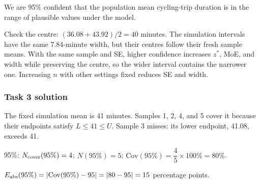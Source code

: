 \par\smallskip
{}
We are 95\% confident that the population mean cycling-trip duration is in the range of plausible values under the model.

Check the centre: $(36.08+43.92)/2=40$ minutes. The simulation intervals have the same 7.84-minute width, but their centres follow their fresh sample means. With the same sample and SE, higher confidence increases $z^*$, MoE, and width while preserving the centre, so the wider interval contains the narrower one. Increasing $n$ with other settings fixed reduces SE and width.

\vspace{-3mm}
\subsubsection*{Task 3 solution}
\vspace{-3mm}
The fixed simulation mean is 41 minutes. Samples 1, 2, 4, and 5 cover it because their endpoints satisfy $L\leq41\leq U$. Sample 3 misses: its lower endpoint, 41.08, exceeds 41.
\par 95\%: $N_{\rm cover}(95\%)=4$; $N(95\%)=5$; $\mathrm{Cov}(95\%)=\dfrac45\times100\%=80\%$.
\par $E_{\rm abs}(95\%)=|\mathrm{Cov}(95\%)-95|=|80-95|=15$ percentage points.

